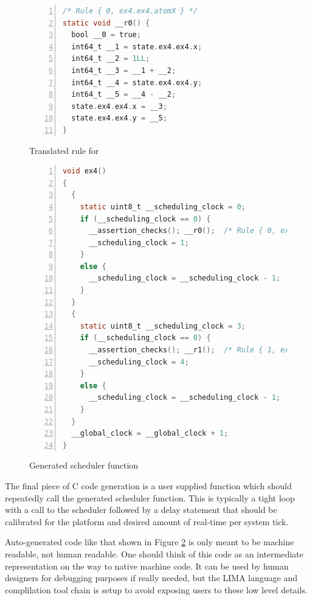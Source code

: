 \begin{figure}
    \begin{lstlisting}[language=C,
                       numbers=left,
                       numberstyle=\scriptsize,
                       stepnumber=1,
                       numbersep=8pt,
                       showstringspaces=false,
                       breaklines=true,
                       frame=single]
/* Rule { 0, ex4.ex4.atomX } */
static void __r0() {
  bool __0 = true;
  int64_t __1 = state.ex4.ex4.x;
  int64_t __2 = 1LL;
  int64_t __3 = __1 + __2;
  int64_t __4 = state.ex4.ex4.y;
  int64_t __5 = __4 - __2;
  state.ex4.ex4.x = __3;
  state.ex4.ex4.y = __5;
}
    \end{lstlisting}
    \caption{Translated rule for }
    \label{fig:code-gen-rule}
\end{figure}

\begin{figure}
    \begin{lstlisting}[language=C,
                       numbers=left,
                       numberstyle=\scriptsize,
                       stepnumber=1,
                       numbersep=8pt,
                       showstringspaces=false,
                       breaklines=true,
                       frame=single]
void ex4()
{
  {
    static uint8_t __scheduling_clock = 0;
    if (__scheduling_clock == 0) {
      __assertion_checks(); __r0();  /* Rule { 0, ex4.ex4.atomX } */
      __scheduling_clock = 1;
    }
    else {
      __scheduling_clock = __scheduling_clock - 1;
    }
  }
  {
    static uint8_t __scheduling_clock = 3;
    if (__scheduling_clock == 0) {
      __assertion_checks(); __r1();  /* Rule { 1, ex4.ex4.atomY } */
      __scheduling_clock = 4;
    }
    else {
      __scheduling_clock = __scheduling_clock - 1;
    }
  }
  __global_clock = __global_clock + 1;
}
    \end{lstlisting}
    \caption{Generated scheduler function}
    \label{fig:code-gen-scheduler}
\end{figure}

The final piece of C code generation is a user supplied  function
which should repeatedly call the generated scheduler function. This is
typically a tight loop with a call to the scheduler followed by a delay
statement that should be calibrated for the platform and desired amount of
real-time per system tick.

Auto-generated code like that shown in Figure \ref{fig:code-gen-scheduler} is only
meant to be machine readable, not human readable. One should think of this code as
an intermediate representation on the way to native machine code. It can be used
by human designers for debugging purposes if really needed, but the LIMA language and
complilation tool chain is setup to avoid exposing users to these low level details.

